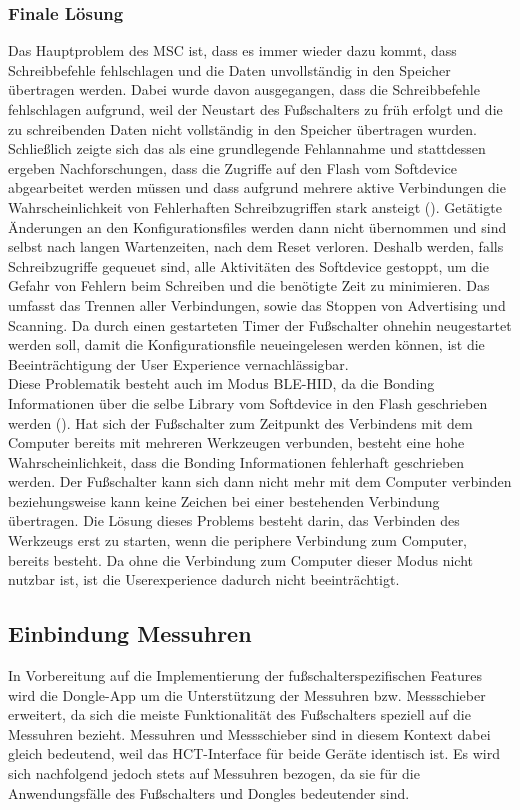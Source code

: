 \subsubsection{Finale Lösung}
Das Hauptproblem des \ac{MSC} ist, dass es immer wieder dazu kommt, dass Schreibbefehle fehlschlagen und die Daten unvollständig in den Speicher übertragen werden. Dabei wurde davon ausgegangen, dass die Schreibbefehle fehlschlagen aufgrund, weil der Neustart des Fußschalters zu früh erfolgt und die zu schreibenden Daten nicht vollständig in den Speicher übertragen wurden. Schließlich zeigte sich das als eine grundlegende Fehlannahme und stattdessen ergeben Nachforschungen, dass die Zugriffe auf den Flash vom Softdevice abgearbeitet werden müssen und dass aufgrund mehrere aktive Verbindungen die Wahrscheinlichkeit von Fehlerhaften Schreibzugriffen stark ansteigt (\cite[Abschnitt SoftDevice Backend]{NRF_fstorage}). Getätigte Änderungen an den Konfigurationsfiles werden dann nicht übernommen und sind selbst nach langen Wartenzeiten, nach dem Reset verloren. Deshalb werden, falls Schreibzugriffe gequeuet sind, alle Aktivitäten des Softdevice gestoppt, um die Gefahr von Fehlern beim Schreiben und die benötigte Zeit zu minimieren. Das umfasst das Trennen aller Verbindungen, sowie das Stoppen von Advertising und Scanning. Da durch einen gestarteten Timer der Fußschalter ohnehin neugestartet werden soll, damit die Konfigurationsfile neueingelesen werden können, ist die Beeinträchtigung der User Experience vernachlässigbar.\\
Diese Problematik besteht auch im Modus \ac{BLE}-\ac{HID}, da die Bonding Informationen über die selbe Library vom Softdevice in den Flash geschrieben werden (\cite{NRF_PeerManager}). Hat sich der Fußschalter zum Zeitpunkt des Verbindens mit dem Computer bereits mit mehreren Werkzeugen verbunden, besteht eine hohe Wahrscheinlichkeit, dass die Bonding Informationen fehlerhaft geschrieben werden. Der Fußschalter kann sich dann nicht mehr mit dem Computer verbinden beziehungsweise kann keine Zeichen bei einer bestehenden Verbindung übertragen. Die Lösung dieses Problems besteht darin, das Verbinden des Werkzeugs erst zu starten, wenn die periphere Verbindung zum Computer, bereits besteht. Da ohne die Verbindung zum Computer dieser Modus nicht nutzbar ist, ist die Userexperience dadurch nicht beeinträchtigt.

\subsection{Einbindung Messuhren}
\label{EinbindungMessuhren}
In Vorbereitung auf die Implementierung der fußschalterspezifischen Features wird die Dongle-App um die Unterstützung der Messuhren bzw. Messschieber erweitert, da sich die meiste Funktionalität des Fußschalters speziell auf die Messuhren bezieht. Messuhren und Messschieber sind in diesem Kontext dabei gleich bedeutend, weil das \ac{HCT}-Interface für beide Geräte identisch ist. Es wird sich nachfolgend jedoch stets auf Messuhren bezogen, da sie für die Anwendungsfälle des Fußschalters und Dongles bedeutender sind.

